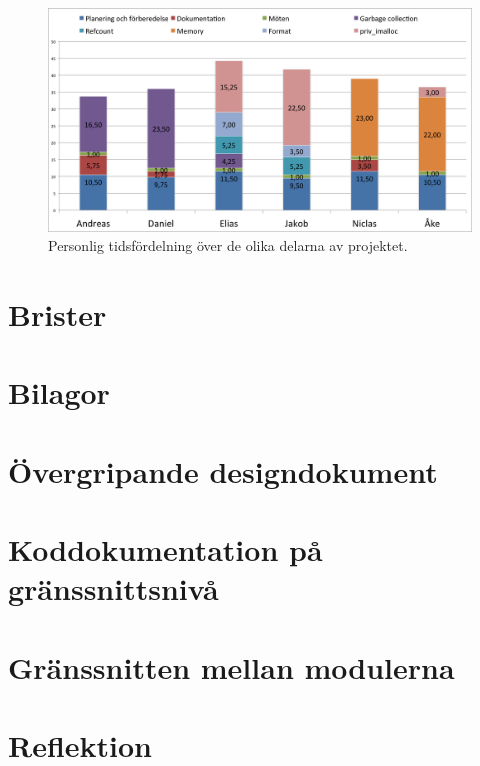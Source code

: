 \documentclass{article}
\begin{document}
\begin{figure}[H]
  \includegraphics[width=\columnwidth]{../bilder/chart_people.png}
  \caption{Personlig tidsfördelning över de olika delarna av projektet.}
  \label{fig:chart_people}
\end{figure}


\section{Brister}


\section{Bilagor}
\appendix
\section{Övergripande designdokument}
\label{sec:design}
\section{Koddokumentation på gränssnittsnivå}
\section{Gränssnitten mellan modulerna}
\section{Reflektion}
\end{document}
